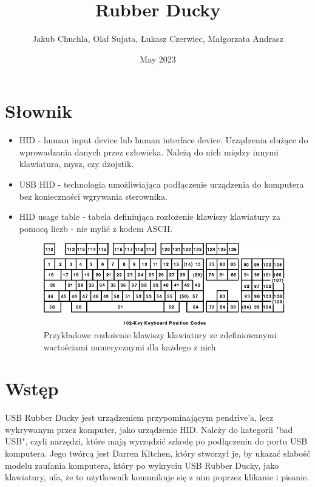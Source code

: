 \documentclass{article}
\title{Rubber Ducky}
\author{Jakub Chuchla, Olaf Sujata, Łukasz Czerwiec, Małgorzata Andrasz}
\date{May 2023}
\begin{document}
\maketitle

\tableofcontents

\section{Słownik}
\begin{itemize}
    \item HID - human input device lub human interface device. Urządzenia służące do wprowadzania danych przez człowieka. Należą do nich między innymi klawiatura, mysz, czy dżojstik.
    \item USB HID - technologia umożliwiająca podłączenie urządzenia do komputera bez konieczności wgrywania sterownika.
    \item HID usage table - tabela definiująca rozłożenie klawiszy klawiatury za pomocą liczb - nie mylić z kodem ASCII.
    \begin{figure}[h]
    \centering
    \includegraphics[scale=0.3]{Media/HID.png}
    \caption{Przykładowe rozłożenie klawiszy klawiatury ze zdefiniowanymi wartościami numerycznymi dla każdego z nich}
    \label{fig:enter-label}
    \end{figure}
    
\end{itemize}

\section{Wstęp}

USB Rubber Ducky jest urządzeniem przypominającym pendrive'a, lecz wykrywanym przez komputer, jako urządzenie HID. Należy do kategorii "bad USB", czyli narzędzi, które mają wyrządzić szkodę po podłączeniu do portu USB komputera. Jego twórcą jest Darren Kitchen, który stworzył je, by ukazać słabość modelu zaufania komputera, który po wykryciu USB Rubber Ducky, jako klawiatury, ufa, że to użytkownik komunikuje się z nim poprzez klikanie i pisanie.
\end{document}
